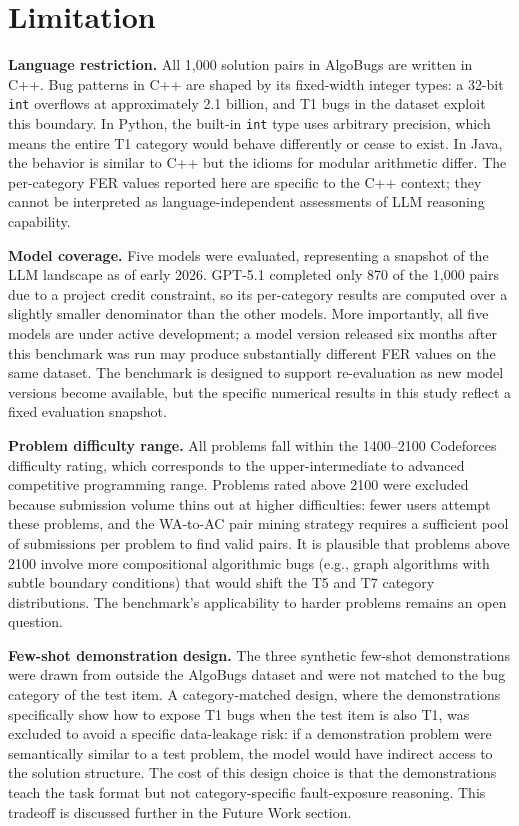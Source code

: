 \section{Limitation}

\textbf{Language restriction.} All 1,000 solution pairs in AlgoBugs are written in C++. Bug patterns in C++ are shaped by its fixed-width integer types: a 32-bit \texttt{int} overflows at approximately 2.1 billion, and T1 bugs in the dataset exploit this boundary. In Python, the built-in \texttt{int} type uses arbitrary precision, which means the entire T1 category would behave differently or cease to exist. In Java, the behavior is similar to C++ but the idioms for modular arithmetic differ. The per-category FER values reported here are specific to the C++ context; they cannot be interpreted as language-independent assessments of LLM reasoning capability.

\textbf{Model coverage.} Five models were evaluated, representing a snapshot of the LLM landscape as of early 2026. GPT-5.1 completed only 870 of the 1,000 pairs due to a project credit constraint, so its per-category results are computed over a slightly smaller denominator than the other models. More importantly, all five models are under active development; a model version released six months after this benchmark was run may produce substantially different FER values on the same dataset. The benchmark is designed to support re-evaluation as new model versions become available, but the specific numerical results in this study reflect a fixed evaluation snapshot.

\textbf{Problem difficulty range.} All problems fall within the 1400--2100 Codeforces difficulty rating, which corresponds to the upper-intermediate to advanced competitive programming range. Problems rated above 2100 were excluded because submission volume thins out at higher difficulties: fewer users attempt these problems, and the WA-to-AC pair mining strategy requires a sufficient pool of submissions per problem to find valid pairs. It is plausible that problems above 2100 involve more compositional algorithmic bugs (e.g., graph algorithms with subtle boundary conditions) that would shift the T5 and T7 category distributions. The benchmark's applicability to harder problems remains an open question.

\textbf{Few-shot demonstration design.} The three synthetic few-shot demonstrations were drawn from outside the AlgoBugs dataset and were not matched to the bug category of the test item. A category-matched design, where the demonstrations specifically show how to expose T1 bugs when the test item is also T1, was excluded to avoid a specific data-leakage risk: if a demonstration problem were semantically similar to a test problem, the model would have indirect access to the solution structure. The cost of this design choice is that the demonstrations teach the task format but not category-specific fault-exposure reasoning. This tradeoff is discussed further in the Future Work section.

